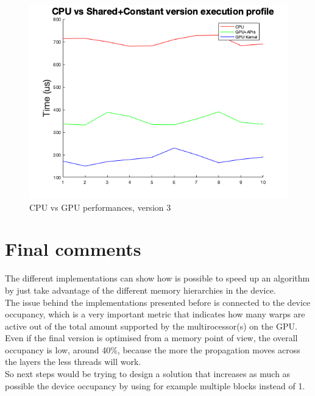 \documentclass[a4paper]{report}
\begin{document}
\begin{figure}[!h]
\centering
\includegraphics[scale=0.6]{docs/cpuVSshared.png} 
\caption{CPU vs GPU performances, version 3}
\label{fig_gpu3}
\end{figure}



\section{Final comments}
The different implementations can show how is possible to speed up an algorithm by just take advantage of the different memory hierarchies in the device.\\
The issue behind the implementations presented before is connected to the device occupancy, which is a very important metric that indicates how many warps are active out of the total amount supported by the multirocessor(s) on the GPU.
Even if the final version is optimised from a memory point of view, the overall occupancy is low, around 40\%, because the more the propagation moves across the layers the less threads will work.\\
So next steps would be trying to design a solution that increases as much as possible the device occupancy by using for example multiple blocks instead of 1.
\end{document}
